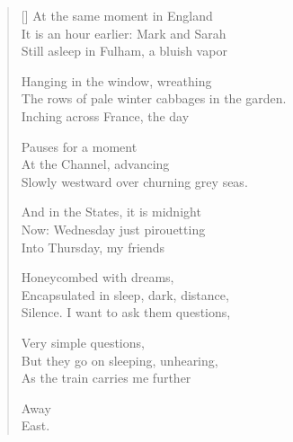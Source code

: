 \label{ch:arabesque}
\settowidth{\versewidth}{The rows of pale winter cabbages in the garden.}
\begin{verse}[\versewidth]
At the same moment in England\\
It is an hour earlier: Mark and Sarah\\
Still asleep in Fulham, a bluish vapor

Hanging in the window, wreathing\\
The rows of pale winter cabbages in the garden.\\
Inching across France, the day

Pauses for a moment\\
At the Channel, advancing\\
Slowly westward over churning grey seas.

And in the States, it is midnight\\
Now: Wednesday just pirouetting\\
Into Thursday, my friends

Honeycombed with dreams,\\
Encapsulated in sleep, dark, distance,\\
Silence.   I want to ask them questions,

Very simple questions,\\
But they go on sleeping, unhearing,\\
As the train carries me further

\hspace*{3\vgap} Away\\
\hspace*{4\vgap} East.
\end{verse}
